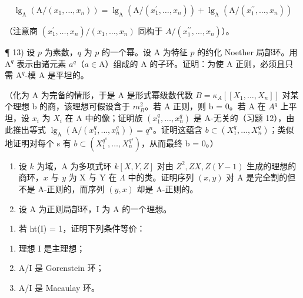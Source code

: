 \[
\lg_ {\mathrm{A}} \left(\mathrm{A} / \left(x _ {1}, \dots , x _ {n}\right)\right) = \lg_ {\mathrm{A}} \left(\mathrm{A} / \left(x _ {1} ^ {\prime}, \dots , x _ {n}\right)\right) + \lg_ {\mathrm{A}} \left(\mathrm{A} / \left(x _ {1} ^ {\prime \prime}, \dots , x _ {n}\right)\right)
\]

（注意商 \((x_{1}^{\prime},\ldots,x_{n})/(x_{1},\ldots,x_{n})\) 同构于 \(A/(x_{1}^{\prime\prime},\ldots,x_{n})\)）。

¶ 13) 设 \(p\) 为素数，\(q\) 为 \(p\) 的一个幂。设 A 为特征 \(p\) 的约化 Noether 局部环。用 \(\mathrm{A}^q\) 表示由诸元素 \(a^q\)（\(a \in \mathrm{A}\)）组成的 A 的子环。证明：为使 A 正则，必须且只需 \(\mathrm{A}^q\)-模 A 是平坦的。

（化为 A 为完备的情形，于是 A 是形式幂级数代数 \(B = \kappa_{A}[[X_{1}, \ldots, X_{n}]]\) 对某个理想 b 的商，该理想可假设含于 \(m_{B}^{2}\)。若 A 正则，则 b = 0。若 A 在 \(A^{q}\) 上平坦，设 \(x_{i}\) 为 \(X_{i}\) 在 A 中的像；证明族 \((x_{1}^{q}, \ldots, x_{n}^{q})\) 是 A-无关的（习题 12），由此推出等式 \(\lg_{\mathrm{A}}(\mathrm{A}/(x_{1}^{q}, \ldots, x_{n}^{q})) = q^{n}\)。证明这蕴含 \(b \subset (X_{1}^{q}, \ldots, X_{n}^{q})\)；类似地证明对每个 s 有 \(b \subset (X_{1}^{q^{s}}, \ldots, X_{n}^{q^{s}})\)，从而最终 b = 0。）


\begin{enumerate}
\def\labelenumi{\arabic{enumi})}
\item
  设 \(k\) 为域，A 为多项式环 \(k[X,Y,Z]\) 对由 \(Z^2,ZX,Z(Y-1)\) 生成的理想的商环，\(x\) 与 \(y\) 为 X 与 Y 在 \(\Lambda\) 中的类。证明序列 \((x,y)\) 对 A 是完全割的但不是 A-正则的，而序列 \((y,x)\) 却是 A-正则的。
\item
  设 A 为正则局部环，I 为 A 的一个理想。
\end{enumerate}

\begin{enumerate}
\def\labelenumi{\alph{enumi})}
\tightlist
\item
  若 ht(I) = 1，证明下列条件等价：
\end{enumerate}

\begin{enumerate}
\def\labelenumi{(\roman{enumi})}
\item
  理想 I 是主理想；
\item
  A/I 是 Gorenstein 环；
\item
  A/I 是 Macaulay 环。
\end{enumerate}

